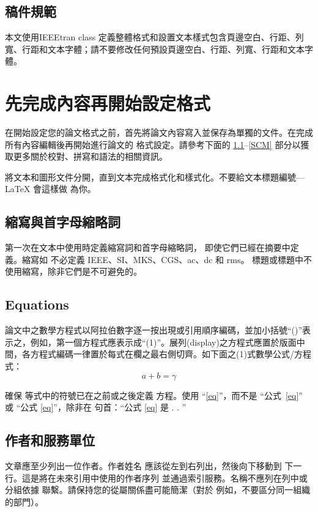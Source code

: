 \documentclass[conference]{IEEEtran}
\begin{document}
\subsection{稿件規範}

本文使用IEEEtran class 定義整體格式和設置文本樣式包含頁邊空白、行距、列寬、行距和文本字體；請不要修改任何預設頁邊空白、行距、列寬、行距和文本字體。

\section{先完成內容再開始設定格式}
在開始設定您的論文格式之前，首先將論文內容寫入並保存為單獨的文件。在完成所有內容編輯後再開始進行論文的
格式設定。請參考下面的 \ref{AA}--\ref{SCM} 部分以獲取更多關於校對、拼寫和語法的相關資訊。

將文本和圖形文件分開，直到文本完成格式化和樣式化。不要給文本標題編號---{\LaTeX} 會這樣做
為你。

\subsection{縮寫與首字母縮略詞}\label{AA}
第一次在文本中使用時定義縮寫詞和首字母縮略詞，
即使它們已經在摘要中定義。縮寫如
不必定義 IEEE、SI、MKS、CGS、ac、dc 和 rms。
標題或標題中不使用縮寫，除非它們是不可避免的。




\subsection{Equations}
論文中之數學方程式以阿拉伯數字逐一按出現或引用順序編碼，並加小括號“()”表示之，例如，第一個方程式應表示成“(1)”。展列(display)之方程式應置於版面中間，各方程式編碼一律置於每式在欄之最右側切齊。如下面之(1)式數學公式/方程式：
\begin{equation}
a+b=\gamma\label{eq}
\end{equation}


確保
等式中的符號已在之前或之後定義
方程。使用 ``\eqref{eq}''，而不是 ``公式~\eqref{eq}'' 或 ``公式 \eqref{eq}''，除非在
句首：``公式 \eqref{eq} 是 . . ''




\subsection{作者和服務單位}
文章應至少列出一位作者。作者姓名
應該從左到右列出，然後向下移動到
下一行。這是將在未來引用中使用的作者序列
並通過索引服務。名稱不應列在列中或分組依據
聯繫。請保持您的從屬關係盡可能簡潔（對於
例如，不要區分同一組織的部門）。
\end{document}
